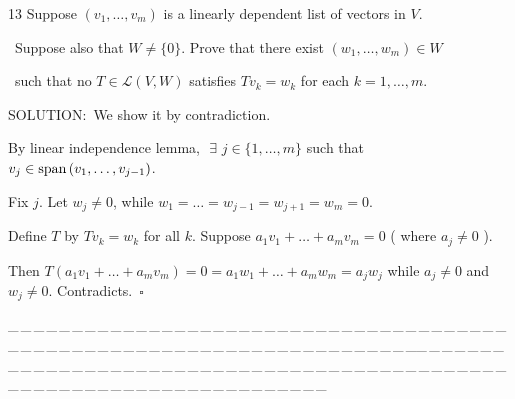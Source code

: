 \documentclass[a4paper, 11pt, UTF8]{article}
\def\Spn{\textup{span}\,}
\def\Lm{\mathcal{L}}
\begin{document}
\begin{large}
{\timesbf\Large 13} {\timessl\Large 
Suppose $(v_1,\dots,v_m)$ is a linearly dependent list of vectors in $V$.}\par\quad\,
{\timessl\Large Suppose also that $W\neq\{0\}$. Prove that there exist $(w_1,\dots,w_m)\in W$}\par\quad\,
{\timessl\Large such that no $T\in\Lm(V, W)$ satisfies $Tv_k=w_k$ for each $k = 1,\dots,m$.
}\par
{\timesbf S\footnotesize{OLUTION:}}\,\,\,We show it by contradiction.\par\quad
By linear independence lemma, $\,\,\exists\,\,j\in\{1,\dots,m\}$ such that $v_j\in\Spn(v_1,\dots,v_{j-1})$.\par\quad
Fix $j$. Let $w_j\neq 0$, while $w_1=\dots=w_{j-1}=w_{j+1}=w_m=0.$\par\quad
Define $T$ by $Tv_k=w_k$ for all $k$. Suppose $a_1 v_1+\dots+a_m v_m=0$ ( where $a_j\neq 0$ ).\par\quad
Then $T(a_1 v_1+\dots+a_m v_m)=0=a_1 w_1+\dots+a_m w_m=a_j w_j$ while $a_j\neq 0$ and $w_j\neq 0.$ Contradicts.$\,\,\,\square$\par
{\tiny \_\,\_\,\_\,\_\,\_\,\_\,\_\,\_\,\_\,\_\,\_\,\_\,\_\,\_\,\_\,\_\,\_\,\_\,\_\,\_\,\_\,\_\,\_\,\_\,\_\,\_\,\_\,\_\,\_\,\_\,\_\,\_\,\_\,\_\,\_\,\_\,\_\,\_\,\_\,\_\,\_\,\_\,\_\,\_\,\_\,\_\,\_\,\_\,\_\,\_\,\_\,\_\,\_\,\_\,\_\,\_\,\_\,\_\,\_\,\_\,\_\,\_\,\_\,\_\,\_\,\_\,\_\,\_\,\_\,\_\,\_\_\,\_\,\_\,\_\,\_\,\_\,\_\,\_\,\_\,\_\,\_\,\_\,\_\,\_\,\_\,\_\,\_\,\_\,\_\,\_\,\_\,\_\,\_\,\_\,\_\,\_\,\_\,\_\,\_\,\_\,\_\,\_\,\_\,\_\,\_\,\_\,\_\,\_\,\_\,\_\,\_\,\_\,\_\,\_\,\_\,\_\,\_\,\_\,\_\,\_\,\_\,\_\,\_\,\_\,\_\,\_\,\_\,\_\,\_\,\_\,\_\,\_\,\_\,\_\,\_\,\_\,\_\,\_\,\_\,\_\,\_}{\tiny\,\par}


\end{large}
\end{document}
